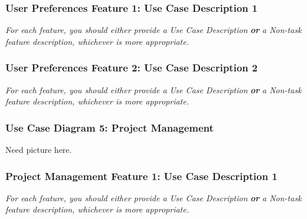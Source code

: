 \documentclass[twoside,letterpaper]{article}
\begin{document}
\newpage

\subsubsection[User Preferences Feature 1: Use Case Description 1]{\rmfamily\bfseries\color{black}
	User Preferences Feature 1: Use Case Description 1}
\hypertarget{RefHeading22059017292}{}
\bigskip

{\color{black}
	\foreignlanguage{english}{\textit{For each feature, you should either provide a Use Case Description
		}}\foreignlanguage{english}{\textbf{\textit{or}}}\foreignlanguage{english}{\textit{ a Non-task feature description,
		whichever is more appropriate.}}}
\newpage

\subsubsection[User Preferences Feature 2: Use Case Description 2]{\rmfamily\bfseries\color{black}
	User Preferences Feature 2: Use Case Description 2}
\hypertarget{RefHeading22059017292}{}
\bigskip

{\color{black}
	\foreignlanguage{english}{\textit{For each feature, you should either provide a Use Case Description
		}}\foreignlanguage{english}{\textbf{\textit{or}}}\foreignlanguage{english}{\textit{ a Non-task feature description,
		whichever is more appropriate.}}}
\newpage

\subsubsection[Use Case Diagram 5: Project Management]{\rmfamily\bfseries\color{black}
	Use Case Diagram 5: Project Management}

Need picture here.

\newpage

\subsubsection[Project Management Feature 1: Use Case Description 1]{\rmfamily\bfseries\color{black}
	Project Management Feature 1: Use Case Description 1}
\hypertarget{RefHeading22059017292}{}
\bigskip

{\color{black}
	\foreignlanguage{english}{\textit{For each feature, you should either provide a Use Case Description
		}}\foreignlanguage{english}{\textbf{\textit{or}}}\foreignlanguage{english}{\textit{ a Non-task feature description,
		whichever is more appropriate.}}}
\newpage
\end{document}

